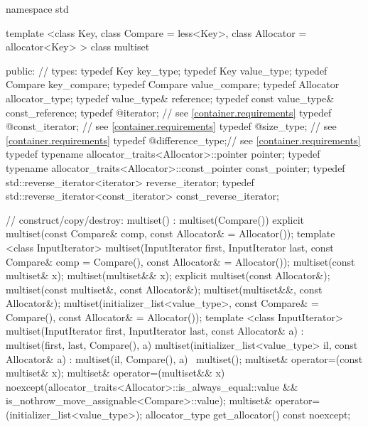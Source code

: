 \begin{codeblock}
namespace std {
  template <class Key, class Compare = less<Key>,
            class Allocator = allocator<Key> >
  class multiset {
  public:
    // types:
    typedef Key                                                     key_type;
    typedef Key                                                     value_type;
    typedef Compare                                                 key_compare;
    typedef Compare                                                 value_compare;
    typedef Allocator                                               allocator_type;
    typedef value_type&                                             reference;
    typedef const value_type&                                       const_reference;
    typedef @\impdef@                iterator;       // see \ref{container.requirements}
    typedef @\impdef@                const_iterator; // see \ref{container.requirements}
    typedef @\impdef@                size_type;      // see \ref{container.requirements}
    typedef @\impdef@                difference_type;// see \ref{container.requirements}
    typedef typename allocator_traits<Allocator>::pointer           pointer;
    typedef typename allocator_traits<Allocator>::const_pointer     const_pointer;
    typedef std::reverse_iterator<iterator>       reverse_iterator;
    typedef std::reverse_iterator<const_iterator> const_reverse_iterator;

    // construct/copy/destroy:
    multiset() : multiset(Compare()) { }
    explicit multiset(const Compare& comp, const Allocator& = Allocator());
    template <class InputIterator>
      multiset(InputIterator first, InputIterator last,
               const Compare& comp = Compare(), const Allocator& = Allocator());
    multiset(const multiset& x);
    multiset(multiset&& x);
    explicit multiset(const Allocator&);
    multiset(const multiset&, const Allocator&);
    multiset(multiset&&, const Allocator&);
    multiset(initializer_list<value_type>, const Compare& = Compare(),
             const Allocator& = Allocator());
    template <class InputIterator>
      multiset(InputIterator first, InputIterator last, const Allocator& a)
        : multiset(first, last, Compare(), a) { }
    multiset(initializer_list<value_type> il, const Allocator& a)
      : multiset(il, Compare(), a) { }
   ~multiset();
    multiset& operator=(const multiset& x);
    multiset& operator=(multiset&& x)
      noexcept(allocator_traits<Allocator>::is_always_equal::value &&
               is_nothrow_move_assignable<Compare>::value);
    multiset& operator=(initializer_list<value_type>);
    allocator_type get_allocator() const noexcept;

}}
\end{codeblock}

